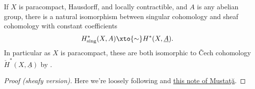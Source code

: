 \documentclass[11pt]{amsart}
\begin{document}
\begin{theorem}\label{thm:Cech-cohomology-and-singular-cohomology} 
If $X$ is paracompact, Hausdorff, and locally contractible, and $A$ is any abelian group, there is a natural isomorphism between singular cohomology and sheaf cohomology with constant coefficients
\begin{align*}
    H^\ast_\text{sing}(X,A) \xto{\sim} H^\ast(X,\underline{A}).
\end{align*}
In particular as $X$ is paracompact, these are both isomorphic to \v{C}ech cohomology $\check{H}^\ast(X,\underline{A})$ by .
\end{theorem}
\begin{proof}[Proof (sheafy version)] Here we're loosely following \cite[III.1]{Bredon-sheaf} and \href{https://public.websites.umich.edu/~mmustata/SingSheafcoho.pdf}{this note of Musta\c{t}\u{a}}.


\end{proof}
\end{document}
